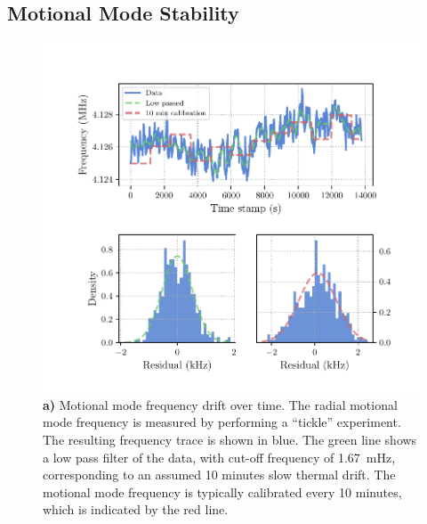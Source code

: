 
\subsection{Motional Mode Stability}
\label{sec:Motional Mode Stability}

    \begin{figure}
        \begin{center}
        \noindent\includegraphics[width=\linewidth]{
            figures/pdf_figure/mode_drift.pdf
            }
        \end{center}
        \caption{
            \textbf{a)} Motional mode frequency drift over time. The radial motional mode frequency is measured by performing a ``tickle'' experiment. The resulting frequency trace is shown in blue. The green line shows a low pass filter of the data, with cut-off frequency of 1.67~mHz, corresponding to an assumed 10 minutes slow thermal drift. The motional mode frequency is typically calibrated every 10 minutes, which is indicated by the red line. 
}
\end{figure}
